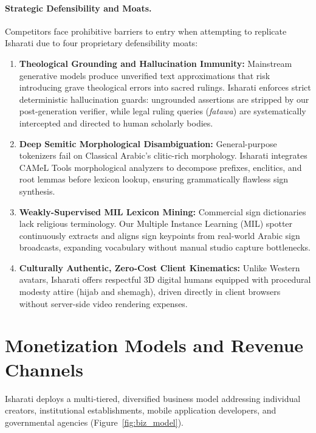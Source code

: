 \paragraph{Strategic Defensibility and Moats.}
Competitors face prohibitive barriers to entry when attempting to replicate Isharati due to four proprietary defensibility moats:
\begin{enumerate}[leftmargin=*,itemsep=2pt]
  \item \textbf{Theological Grounding and Hallucination Immunity:} Mainstream generative models produce unverified text approximations that risk introducing grave theological errors into sacred rulings. Isharati enforces strict deterministic hallucination guards: ungrounded assertions are stripped by our post-generation verifier, while legal ruling queries (\textit{fatawa}) are systematically intercepted and directed to human scholarly bodies.
  \item \textbf{Deep Semitic Morphological Disambiguation:} General-purpose tokenizers fail on Classical Arabic's clitic-rich morphology. Isharati integrates CAMeL Tools morphological analyzers to decompose prefixes, enclitics, and root lemmas before lexicon lookup, ensuring grammatically flawless sign synthesis.
  \item \textbf{Weakly-Supervised MIL Lexicon Mining:} Commercial sign dictionaries lack religious terminology. Our Multiple Instance Learning (MIL) spotter continuously extracts and aligns sign keypoints from real-world Arabic sign broadcasts, expanding vocabulary without manual studio capture bottlenecks.
  \item \textbf{Culturally Authentic, Zero-Cost Client Kinematics:} Unlike Western avatars, Isharati offers respectful 3D digital humans equipped with procedural modesty attire (hijab and shemagh), driven directly in client browsers without server-side video rendering expenses.
\end{enumerate}

\section{Monetization Models and Revenue Channels}
\label{sec:biz_monetization}
Isharati deploys a multi-tiered, diversified business model addressing individual creators, institutional establishments, mobile application developers, and governmental agencies (Figure~\ref{fig:biz_model}).

